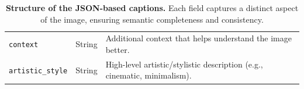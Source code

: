 \begin{table}[t]
\begin{tabularx}{\textwidth}{@{}p{3.9cm}p{2.4cm}X@{}}
\texttt{context} & String & Additional context that helps understand the image better. \\

\texttt{artistic\_style} & String & High-level artistic/stylistic description (e.g., cinematic, minimalism). \\
\bottomrule
\end{tabularx}
\caption{\textbf{Structure of the JSON-based captions.} Each field captures a distinct aspect of the image, ensuring semantic completeness and consistency.}
\label{tab:JSON-structure}
\end{table}
